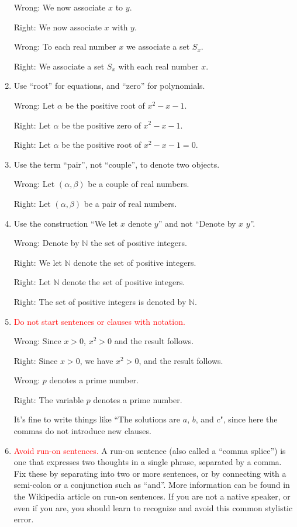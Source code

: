 \documentclass[12pt]{article}
\begin{document}
\begin{enumerate}
Wrong:  We now associate $x$ to $y$.

Right:  We now associate $x$ with $y$.

Wrong:  To each real number $x$ we associate a set $S_x$.

Right:  We associate a set $S_x$ with each real number $x$.

\item Use ``root'' for equations, and ``zero'' for polynomials. 

Wrong:  Let $\alpha$ be the positive root of $x^2 - x - 1$.

Right:  Let $\alpha$ be the positive zero of $x^2 - x - 1$.

Right:  Let $\alpha$ be the positive root of $x^2 -x - 1 = 0$.

\item Use the term ``pair'', not ``couple'', to denote two objects.

Wrong:  Let $(\alpha, \beta)$ be a couple of real numbers.

Right:  Let $(\alpha, \beta)$ be a pair of real numbers.

\item Use the construction ``We let $x$ denote $y$'' and not
``Denote by $x$ $y$''.

Wrong:  Denote by $\mathbb{N}$ the set of positive integers.

Right:  We let $\mathbb{N}$ denote the set of positive integers.

Right:  Let $\mathbb{N}$ denote the set of positive integers.

Right:  The set of positive integers is denoted by $\mathbb{N}$.

\item \textcolor{red}{Do not start sentences or clauses with notation.}

Wrong:  Since $x>0$, $x^2>0$ and the result follows.

Right:  Since $x>0$, we have $x^2>0$, and the result follows.

Wrong:  $p$ denotes a prime number.

Right:  The variable $p$ denotes a prime number.

It's fine to write things like ``The solutions are $a$, $b$, and $c$",
since here the commas do not introduce new clauses.

\item \textcolor{red}{Avoid run-on sentences.}
A run-on sentence (also called a ``comma splice'') is one that
expresses two thoughts in a single phrase, separated by
a comma.  Fix these by separating
into two or more sentences, or by connecting with a semi-colon
or a conjunction such as ``and''.   More information can be found
in the Wikipedia article on run-on sentences.  If you are not a native
speaker, or even if you are, you should learn to recognize and avoid
this common stylistic error.


\end{enumerate}
\end{document}
